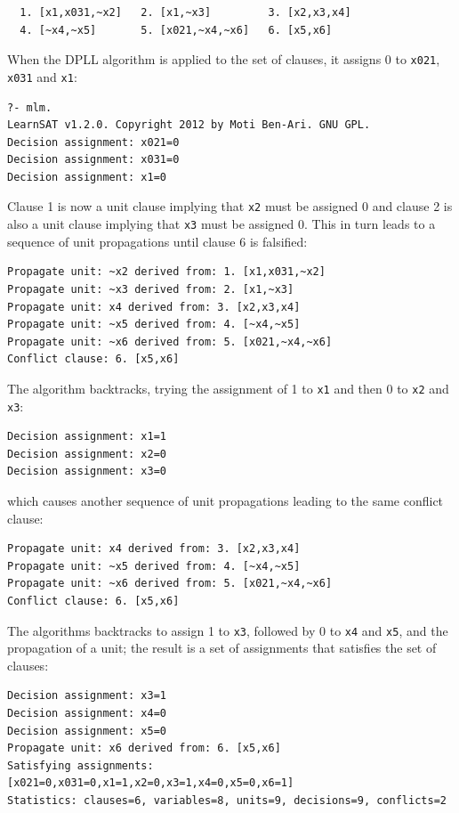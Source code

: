 \documentclass[11pt]{report}
\newcommand*{\p}[1]{\textup{\texttt{#1}}}
\begin{document}
\begin{verbatim}
  1. [x1,x031,~x2]   2. [x1,~x3]         3. [x2,x3,x4]
  4. [~x4,~x5]       5. [x021,~x4,~x6]   6. [x5,x6]
\end{verbatim}

When the DPLL algorithm is applied to the set of clauses, it assigns
0 to \p{x021}, \p{x031} and \p{x1}:

\begin{verbatim}
?- mlm.
LearnSAT v1.2.0. Copyright 2012 by Moti Ben-Ari. GNU GPL.
Decision assignment: x021=0
Decision assignment: x031=0
Decision assignment: x1=0
\end{verbatim}

Clause 1 is now a unit clause implying that \p{x2} must be assigned 0
and clause 2 is also a unit clause implying that \p{x3} must be assigned
0. This in turn leads to a sequence of unit propagations until clause 6
is falsified:

\begin{verbatim}
Propagate unit: ~x2 derived from: 1. [x1,x031,~x2]
Propagate unit: ~x3 derived from: 2. [x1,~x3]
Propagate unit: x4 derived from: 3. [x2,x3,x4]
Propagate unit: ~x5 derived from: 4. [~x4,~x5]
Propagate unit: ~x6 derived from: 5. [x021,~x4,~x6]
Conflict clause: 6. [x5,x6]
\end{verbatim}

\pagebreak[3]

The algorithm backtracks, trying the assignment of 1 to \p{x1} and then
0 to \p{x2} and \p{x3}:
\begin{verbatim}
Decision assignment: x1=1
Decision assignment: x2=0
Decision assignment: x3=0
\end{verbatim}
which causes another sequence of unit propagations leading to the same
conflict clause:
\begin{verbatim}
Propagate unit: x4 derived from: 3. [x2,x3,x4]
Propagate unit: ~x5 derived from: 4. [~x4,~x5]
Propagate unit: ~x6 derived from: 5. [x021,~x4,~x6]
Conflict clause: 6. [x5,x6]
\end{verbatim}

The algorithms backtracks to assign 1 to \p{x3}, followed by 0 to \p{x4}
and \p{x5}, and the propagation of a unit; the result is a set of
assignments that satisfies the set of clauses:
\begin{verbatim}
Decision assignment: x3=1
Decision assignment: x4=0
Decision assignment: x5=0
Propagate unit: x6 derived from: 6. [x5,x6]
Satisfying assignments:
[x021=0,x031=0,x1=1,x2=0,x3=1,x4=0,x5=0,x6=1]
Statistics: clauses=6, variables=8, units=9, decisions=9, conflicts=2
\end{verbatim}
\end{document}
